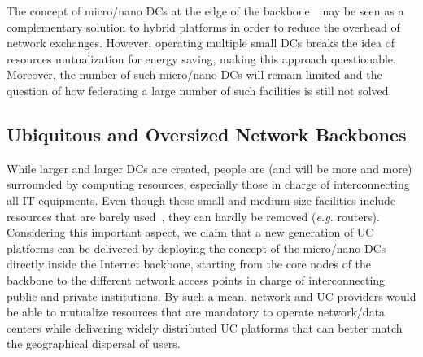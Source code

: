 The concept of micro/nano DCs at the edge of the 
backbone~\cite{greenberg:sigcomm09} may be seen as a complementary solution to hybrid
platforms in order to reduce the overhead of network exchanges.  However, operating multiple small DCs breaks
the idea of resources mutualization for energy saving, making this approach questionable. 
Moreover, 
the number of such micro/nano DCs will remain limited and the question of how
federating a large number of such facilities is still not solved.


\subsection{Ubiquitous and Oversized Network Backbones}
While larger and larger DCs are created, people are (and will be more and more)
surrounded by computing resources, especially those in charge of
interconnecting all IT equipments. Even though these small and medium-size
facilities include resources that are barely used~\cite{Andrew:2003,
Benson:2010}, they can hardly be removed (\textit{e.g.} routers).  Considering
this important aspect, we claim that a new generation of UC platforms can be
delivered by deploying the concept of the  micro/nano DCs directly inside the
Internet backbone, starting from the core nodes of the backbone to the
different network access points in charge of interconnecting public and private
institutions.  By such a mean, network and UC providers would be able to
mutualize resources that are mandatory to operate network/data centers while
delivering widely distributed UC platforms that can better match the
geographical dispersal of users. 


